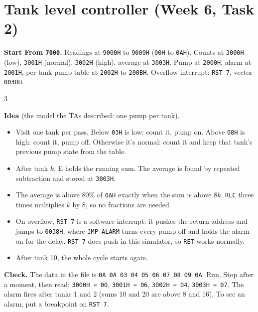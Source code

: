 \documentclass[11pt,a4paper]{article}
\newcommand{\code}[1]{\texttt{#1}}
\newcommand{\prog}[2]{\needspace{12\baselineskip}\section{#1}\label{#2}}
\newcommand{\meta}[2]{\textbf{Start From \code{#1}.} #2\par}
\begin{document}
\newpage
\prog{Tank level controller (Week 6, Task 2)}{p15}
\meta{7000}{Readings at \code{9000H} to \code{9009H} (\code{00H} to \code{0AH}). Counts at \code{3000H} (low), \code{3001H} (normal), \code{3002H} (high), average at \code{3003H}. Pump at \code{2000H}, alarm at \code{2001H}, per-tank pump table at \code{2002H} to \code{200BH}. Overflow interrupt: \code{RST 7}, vector \code{0038H}.}
\begin{multicols}{3}

\end{multicols}
\textbf{Idea} (the model the TAs described: one pump per tank).
\begin{itemize}[leftmargin=*]
\item Visit one tank per pass. Below \code{03H} is low: count it, pump on. Above \code{08H} is high: count it, pump off. Otherwise it's normal: count it and keep that tank's previous pump state from the table.
\item After tank $k$, E holds the running sum. The average is found by repeated subtraction and stored at \code{3003H}.
\item The average is above 80\% of \code{0AH} exactly when the sum is above $8k$. \code{RLC} three times multiplies $k$ by 8, so no fractions are needed.
\item On overflow, \code{RST 7} is a software interrupt: it pushes the return address and jumps to \code{0038H}, where \code{JMP ALARM} turns every pump off and holds the alarm on for the delay. \code{RST 7} does push in this simulator, so \code{RET} works normally.
\item After tank 10, the whole cycle starts again.
\end{itemize}
\textbf{Check.} The data in the file is \code{0A 0A 03 04 05 06 07 08 09 0A}. Run, Stop after a moment, then read: \code{3000H = 00}, \code{3001H = 06}, \code{3002H = 04}, \code{3003H = 07}. The alarm fires after tanks 1 and 2 (sums 10 and 20 are above 8 and 16). To see an alarm, put a breakpoint on \code{RST 7}.
\end{document}
